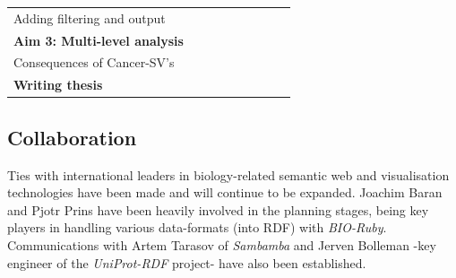 \documentclass[twoside,fontsize=10pt]{article}
\begin{document}
\begin{table}[h]
\begin{center}
\begin{tabular}{lllllllll}
\hspace*{1em} Adding filtering and output       &                                                 &                                                 &                                                 & \cellcolor[HTML]{656565}                        &                                                \cellcolor[HTML]{656565}   &                                                 &                                                 &                                                 \\
\textbf{Aim 3: Multi-level analysis}            &                                                 &                                                 &                                                 &                                                 &  & \cellcolor[HTML]{343434}{\color[HTML]{343434} } & \cellcolor[HTML]{343434}{\color[HTML]{343434} } & \cellcolor[HTML]{343434}{\color[HTML]{343434} } \\
\hspace*{1em} Consequences of Cancer-SV's       &                                                 &                                                 &                                                 &                                                 &                        & \cellcolor[HTML]{656565}                        & \cellcolor[HTML]{656565}                        & \cellcolor[HTML]{656565}                        \\
\textbf{Writing thesis}                         &                                                 &                                                 &                                                 &                                                 &                                                 &                                                 &                                                 & \cellcolor[HTML]{343434}                       
\end{tabular}
\end{center}
\end{table}


\subsection*{Collaboration}
Ties with international leaders in biology-related semantic web and visualisation technologies have been made and will continue to be expanded. Joachim Baran and Pjotr Prins have been heavily involved in the planning stages, being key players in handling various data-formats (into RDF) with \textit{BIO-Ruby}. Communications with Artem Tarasov of \textit{Sambamba} and Jerven Bolleman -key engineer of the \textit{UniProt-RDF} project- have also been established.
\end{document}
